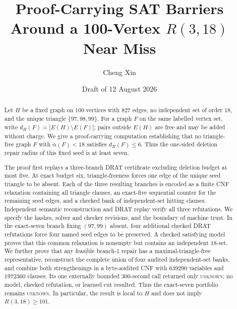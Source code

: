 \documentclass[11pt,reqno]{amsart}
\title[Proof-carrying local Ramsey barrier]{Proof-Carrying SAT Barriers Around a 100-Vertex \texorpdfstring{$R(3,18)$}{R(3,18)} Near Miss}
\author{Cheng Xin}
\date{Draft of 12 August 2026}
\theoremstyle{definition}
\theoremstyle{remark}
\begin{document}
\begin{abstract}
Let \(H\) be a fixed graph on \(100\) vertices with \(827\) edges, no
independent set of order \(18\), and the unique triangle
\(\{97,98,99\}\).  For a graph \(F\) on the same labelled vertex set, write
\(d_H(F)=|E(H)\setminus E(F)|\); pairs outside \(E(H)\) are free and may be
added without charge.  We give a proof-carrying computation establishing
that no triangle-free graph \(F\) with \(\alpha(F)<18\) satisfies
\(d_H(F)\le 6\).  Thus the one-sided deletion repair radius of this fixed
seed is at least seven.

The proof first replays a three-branch DRAT certificate excluding deletion
budget at most five.  At exact budget six, triangle-freeness forces one edge
of the unique seed triangle to be absent.  Each of the three resulting
branches is encoded as a finite CNF relaxation containing all triangle
clauses, an exact-five sequential counter for the remaining seed edges, and
a checked bank of independent-set hitting clauses.  Independent semantic
reconstruction and DRAT replay verify all three refutations.  We specify the
hashes, solver and checker revisions, and the boundary of machine trust.  In
the exact-seven branch fixing \((97,99)\) absent, four additional checked DRAT
refutations force four named seed edges to be preserved.  A checked
satisfying model proves that this common relaxation is nonempty but contains
an independent \(18\)-set.  We further prove that any feasible branch-1 repair
has a maximal-triangle-free representative, reconstruct the complete union of
four audited independent-set banks, and combine both strengthenings in a
byte-audited CNF with \(639290\) variables and \(1972360\) clauses.  Its one
externally bounded \(300\)-second call returned only \textsc{unknown}; no model,
checked refutation, or learned cut resulted.  Thus the exact-seven portfolio
remains \textsc{unknown}.  In particular, the result is local to \(H\) and does
not imply \(R(3,18)\ge 101\).
\end{abstract}

\maketitle
\tableofcontents










\appendix






\end{document}
